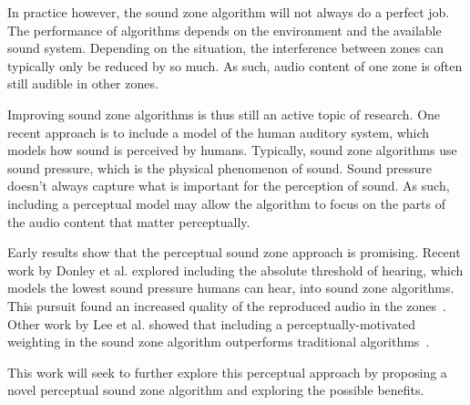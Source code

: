 In practice however, the sound zone algorithm will not always do a perfect job.
The performance of algorithms depends on the environment and the available sound system.
Depending on the situation, the interference between zones can typically only be reduced by so much.
As such, audio content of one zone is often still audible in other zones.

Improving sound zone algorithms is thus still an active topic of research.
One recent approach is to include a model of the human auditory system, which models how sound is perceived by humans.
Typically, sound zone algorithms use sound pressure, which is the physical phenomenon of sound.
Sound pressure doesn't always capture what is important for the perception of sound.
As such, including a perceptual model may allow the algorithm to focus on the parts of the audio content
that matter perceptually.

Early results show that the perceptual sound zone approach is promising.
Recent work by Donley et al. explored including the absolute threshold of hearing, which models the lowest sound pressure
humans can hear, into sound zone algorithms.
This pursuit found an increased quality of the reproduced audio in the zones~\cite{donley2015multizone}.
Other work by Lee et al. showed that including a perceptually-motivated weighting in the sound zone algorithm outperforms 
traditional algorithms~\cite{lee2019towards,lee2020signal}.

This work will seek to further explore this perceptual approach by proposing a novel perceptual sound zone algorithm and exploring
the possible benefits.
